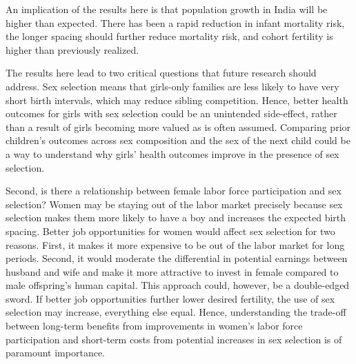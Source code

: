 \documentclass[12pt,letterpaper]{article}
\begin{document}
An implication of the results here is that population growth in India
will be higher than expected. There has been a rapid reduction in infant
mortality risk, the longer spacing should further reduce mortality risk,
and cohort fertility is higher than previously realized.



The results here lead to two critical questions that future research should address.
Sex selection means that girls-only families are less likely to have
very short birth intervals, which may reduce sibling competition. 
Hence, better health outcomes for girls with sex selection could be an
unintended side-effect, rather than a result of girls becoming more
valued as is often assumed. 
Comparing prior children's outcomes across
sex composition and the sex of the next child could be a way to
understand why girls' health outcomes improve in the presence of sex selection.

Second, is there a relationship between female labor force participation
and sex selection? Women may be staying out of the labor market
precisely because sex selection makes them more likely to have a boy and
increases the expected birth spacing. Better job opportunities for women
would affect sex selection for two reasons. First, it makes it more
expensive to be out of the labor market for long periods. Second, it
would moderate the differential in potential earnings between husband
and wife and make it more attractive to invest in female compared to
male offspring's human capital. This approach could, however, be a
double-edged sword. If better job opportunities further lower desired
fertility, the use of sex selection may increase, everything else equal.
Hence, understanding the trade-off between long-term benefits from
improvements in women's labor force participation and short-term costs
from potential increases in sex selection is of paramount importance.





\clearpage

\onehalfspacing


\end{document}
